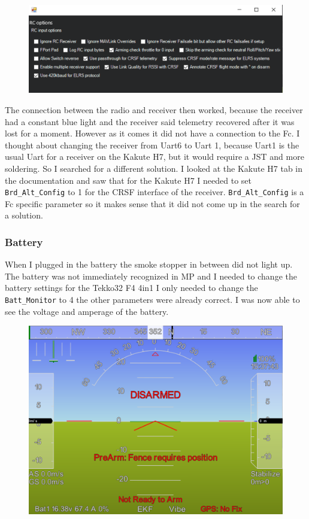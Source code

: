\documentclass{article}
\begin{document}
\begin{figure}[h]
	\centering
	\includegraphics[width=0.7\linewidth]{pictures/bitmask}
	\caption{}
	\label{fig:bitmask}
\end{figure}

	The connection between the radio and receiver then worked, because the receiver had a constant blue light and the receiver said telemetry recovered after it was lost for a moment. However as it comes it did not have a connection to the Fc. I thought about changing the receiver from Uart6 to Uart 1, because Uart1 is the usual Uart for a receiver on the Kakute H7, but it would require a JST and more soldering. So I searched for a different solution. I looked at the Kakute H7 tab in the documentation and saw that for the Kakute H7 I needed to set \lstinline|Brd_Alt_Config| to 1 for the CRSF interface of the receiver. \lstinline|Brd_Alt_Config| is a Fc specific parameter so it makes sense that it did not come up in the search for a solution. 

	\subsubsection*{Battery}
	When I plugged in the battery the smoke stopper in between did not light up. The battery was not immediately recognized in MP and I needed to change the battery settings for the Tekko32 F4 4in1 I only needed to change the \lstinline|Batt_Monitor| to 4 the other parameters were already correct. I was now able to see the voltage and amperage of the battery.
	
\begin{figure}[h]
	\centering
	\includegraphics[width=0.7\linewidth]{pictures/Battery}
	\caption{}
	\label{fig:battery}
\end{figure}
	
\end{document}

